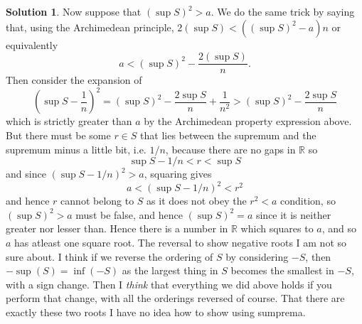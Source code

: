 \documentclass[10pt]{article}
\theoremstyle{definition}
\newtheorem{soln}{Solution}
\begin{document}
\begin{soln}
  Now suppose that $(\sup S)^2>a$. We do the same trick by saying that, using the Archimedean principle,
  $2(\sup S)<((\sup S)^2-a)n$ or equivalently 
  $$a<(\sup S)^2-\frac{2(\sup S)}{n}.$$
  Then consider the expansion of 
  $$\left(\sup S-\frac{1}{n}\right)^2=(\sup S)^2-\frac{2\sup S}{n}+\frac{1}{n^2}> (\sup S)^2 -\frac{2\sup S}{n}$$
  which is strictly greater than $a$ by the Archimedean property expression above. But there must be some 
  $r\in S$ that lies between the supremum and the supremum minus a little bit, i.e. $1/n$, because there are no gaps in $\mathbb{R}$
  so
  $$\sup S-1/n<r<\sup S$$
  and since $(\sup S-1/n)^2> a$, squaring gives 
  $$a<(\sup S-1/n)^2<r^2$$
  and hence $r$ cannot belong to $S$ as it does not obey the $r^2<a$ condition, so $(\sup S)^2>a$ must be false, and hence
  $(\sup S)^2=a$ since it is neither greater nor lesser than. Hence there is a number in $\mathbb{R}$ which squares to $a$, and so $a$ 
  has atleast one square root. The reversal to show negative roots I am not so sure about. I think if we reverse the ordering of $S$ by considering $-S$, then 
  $-\sup(S)=\inf(-S)$ as the largest thing in $S$ becomes the smallest in $-S$, with a sign change. Then I \emph{think} that
  everything we did above holds if you perform that change, with all the orderings reversed of course. That there are exactly these two roots
  I have no idea how to show using sumprema.
\end{soln}
\end{document}
